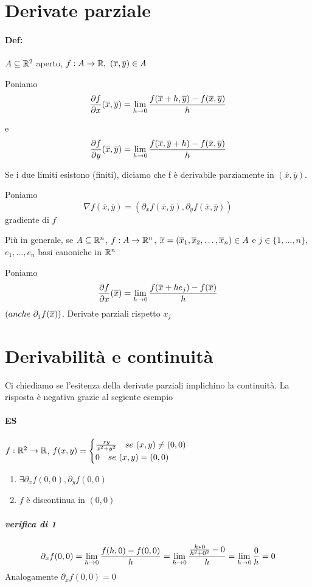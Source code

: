 \documentclass[a4paper]{article}
\begin{document}
\section{Derivate parziale}
\paragraph{Def:} $A \subseteq \mathbb{R} ^2$ aperto, $f: A \to \mathbb{R},\ (\overline x, \overline y) \in A$

Poniamo
$$
{ \partial f \over \partial x } (\overline x, \overline y) = \lim_{h \to 0} { f(\overline x+h, \overline y) - f(\overline x, \overline y) \over h } \\
$$

e
$$
{ \partial f \over \partial y } (\overline x, \overline y) = \lim_{h \to 0} { f(\overline x, \overline y +h) - f(\overline x, \overline y) \over h } \\
$$

Se i due limiti esistono (finiti), diciamo che f è derivabile parziamente in $(\overline x, \overline y)$.

Poniamo
$$
\nabla f(\overline x, \overline y) = ( \partial_x f(\overline x, \overline y), \partial_y f(\overline x, \overline y))
$$
gradiente di $f$

Più in generale, se $A \subseteq \mathbb{R} ^n$, $f: A \to \mathbb{R} ^n$, $\overline{x} = (\overline{x}_1, \overline{x}_2, \dots, \overline{x}_n) \in A$ e $j \in \{1, \dots, n\}$, $e_1, \dots, e_n$ basi canoniche in $\mathbb{R} ^n$

Poniamo
$$
{ \partial f \over \partial x }(\overline{x}) = \lim_{h \to 0} { f( \overline{x} + h e_j) - f(\overline{x}) \over h} \\
$$
$(anche\ \partial_j f(\overline{x}))$. Derivate parziali rispetto $x_j$

\section{Derivabilità e continuità}
Ci chiediamo se l'esitenza della derivate parziali implichino la continuità. La risposta è negativa grazie al segiente esempio
\paragraph{ES} $f: \mathbb{R} ^ 2 \to \mathbb{R}$, $ f(x,y)= \begin{cases} { xy \over x^2 +y^2} \quad se\ (x,y) \neq (0,0) \\ 0 \quad se\ (x,y) = (0,0) \end{cases}$
	\begin{enumerate}
		\item $ \exists \partial_x f(0,0), \partial_y f(0,0) $
		\item $f$ è discontinua in $(0,0)$
	\end{enumerate}
\subparagraph{verifica di 1}
$$
\partial_x f(0,0) = \lim_{h \to 0} {f(h,0) -f(0,0) \over h} = \lim_{h \to 0} { {h*0 \over h^2 + 0^2} - 0 \over h} = \lim_{h \to 0} {0 \over h} = 0
$$
Analogamente $\partial_x f(0,0) = 0$
\end{document}
